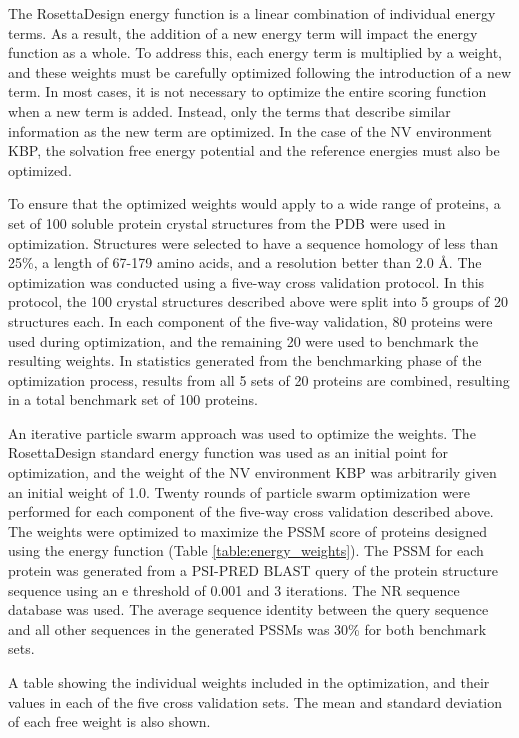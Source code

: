 The RosettaDesign energy function is a linear combination of individual energy terms.
As a result, the addition of a new energy term will impact the energy function as a whole.
To address this, each energy term is multiplied by a weight, and these weights must be carefully optimized following the introduction of a new term.
In most cases, it is not necessary to optimize the entire scoring function when a new term is added.
Instead, only the terms that describe similar information as the new term are optimized.
In the case of the \ac{NV} environment \ac{KBP}, the solvation free energy potential and the reference energies must also be optimized. 

To ensure that the optimized weights would apply to a wide range of proteins, a set of 100 soluble protein crystal structures from the \ac{PDB} were used in optimization.
Structures were selected to have a sequence homology of less than 25\%, a length of 67-179 amino acids, and a resolution better than 2.0 \AA.
The optimization was conducted using a five-way cross validation protocol.
In this protocol, the 100 crystal structures described above were split into 5 groups of 20 structures each.
In each component of the five-way validation, 80 proteins were used during optimization, and the remaining 20 were used to benchmark the resulting weights.
In statistics generated from the benchmarking phase of the optimization process, results from all 5 sets of 20 proteins are combined, resulting in a total benchmark set of 100 proteins. 

An iterative particle swarm approach \citep{Chen:2007ua} was used to optimize the weights.
The RosettaDesign standard energy function was used as an initial point for optimization, and the weight of the \ac{NV} environment \ac{KBP} was arbitrarily given an initial weight of 1.0.
Twenty rounds of particle swarm optimization were performed for each component of the five-way cross validation described above.
The weights were optimized to maximize the \ac{PSSM} score of proteins designed using the energy function (Table \ref{table:energy_weights}).
The \ac{PSSM} for each protein was generated from a PSI-PRED \ac{BLAST} query of the protein structure sequence using an e threshold of 0.001 and 3 iterations.
The \ac{NR} sequence database was used.
The average sequence identity between the query sequence and all other sequences in the generated \ac{PSSM}s was 30\% for both benchmark sets.

\begin{table}
\scriptsize
\renewcommand{\tabcolsep}{0.09cm}
\centering

\caption{A table showing the individual weights included in the optimization, and their values in each of the five cross validation sets.  The mean and standard deviation of each free weight is also shown. }
\label{table:energy_weights}
\end{table}

